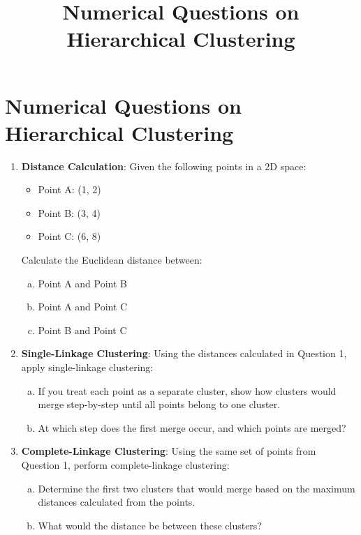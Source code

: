 \documentclass{article}
\title{Numerical Questions on Hierarchical Clustering}
\author{}
\date{}
\begin{document}
\maketitle

\section*{Numerical Questions on Hierarchical Clustering}

\begin{enumerate}[1.]
    \item \textbf{Distance Calculation}:  
    Given the following points in a 2D space:
    \begin{itemize}
        \item Point A: (1, 2)
        \item Point B: (3, 4)
        \item Point C: (6, 8)
    \end{itemize}
    Calculate the Euclidean distance between:
    \begin{enumerate}[(a)]
        \item Point A and Point B  
        \item Point A and Point C  
        \item Point B and Point C  
    \end{enumerate}

    \item \textbf{Single-Linkage Clustering}:  
    Using the distances calculated in Question 1, apply single-linkage clustering:
    \begin{enumerate}[(a)]
        \item If you treat each point as a separate cluster, show how clusters would merge step-by-step until all points belong to one cluster.  
        \item At which step does the first merge occur, and which points are merged?
    \end{enumerate}

    \item \textbf{Complete-Linkage Clustering}:  
    Using the same set of points from Question 1, perform complete-linkage clustering:
    \begin{enumerate}[(a)]
        \item Determine the first two clusters that would merge based on the maximum distances calculated from the points.  
        \item What would the distance be between these clusters?
    \end{enumerate}


\end{enumerate}
\end{document}
